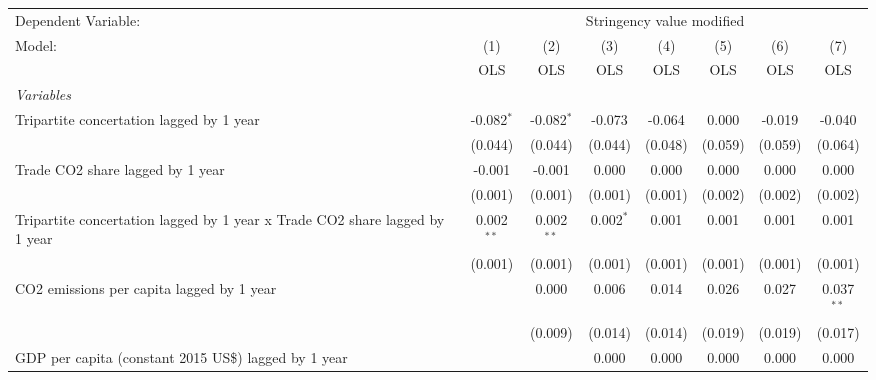 
\begingroup
\centering
\begin{tabular}{lccccccc}
   \toprule
   Dependent Variable: & \multicolumn{7}{c}{Stringency value modified}\\
   Model:                                                                      & (1)          & (2)          & (3)         & (4)     & (5)          & (6)          & (7)\\  
                                                                               &  OLS         & OLS          & OLS         & OLS     & OLS          & OLS          & OLS\\  
   \midrule
   \emph{Variables}\\
   Tripartite concertation lagged by 1 year                                    & -0.082$^{*}$ & -0.082$^{*}$ & -0.073      & -0.064  & 0.000        & -0.019       & -0.040\\   
                                                                               & (0.044)      & (0.044)      & (0.044)     & (0.048) & (0.059)      & (0.059)      & (0.064)\\   
   Trade CO2 share lagged by 1 year                                            & -0.001       & -0.001       & 0.000       & 0.000   & 0.000        & 0.000        & 0.000\\   
                                                                               & (0.001)      & (0.001)      & (0.001)     & (0.001) & (0.002)      & (0.002)      & (0.002)\\   
   Tripartite concertation lagged by 1 year x Trade CO2 share lagged by 1 year & 0.002$^{**}$ & 0.002$^{**}$ & 0.002$^{*}$ & 0.001   & 0.001        & 0.001        & 0.001\\   
                                                                               & (0.001)      & (0.001)      & (0.001)     & (0.001) & (0.001)      & (0.001)      & (0.001)\\   
   CO2 emissions per capita lagged by 1 year                                   &              & 0.000        & 0.006       & 0.014   & 0.026        & 0.027        & 0.037$^{**}$\\   
                                                                               &              & (0.009)      & (0.014)     & (0.014) & (0.019)      & (0.019)      & (0.017)\\   
   GDP per capita (constant 2015 US\$) lagged by 1 year                        &              &              & 0.000       & 0.000   & 0.000        & 0.000        & 0.000\\   

\end{tabular}
